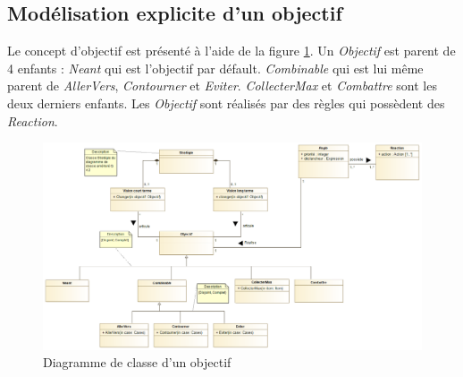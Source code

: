 
\subsection{Modélisation explicite d'un objectif}
\label{sec:question10}

Le concept d'objectif est présenté à l'aide de la figure \ref{fig:objectif}. Un \emph{Objectif} est parent de 4 enfants : \emph{Neant} qui est l'objectif par défault. \emph{Combinable} qui est lui même parent de \emph{AllerVers}, \emph{Contourner} et \emph{Eviter}.
\emph{CollecterMax} et \emph{Combattre} sont les deux derniers enfants.
Les \emph{Objectif} sont réalisés par des règles qui possèdent des \emph{Reaction}.

\begin{figure}[h!]
	\centering
	\includegraphics[width=450pt]{assets/class__Objectif}
	\caption{Diagramme de classe d'un objectif}
	\label{fig:objectif}
\end{figure}

\newpage